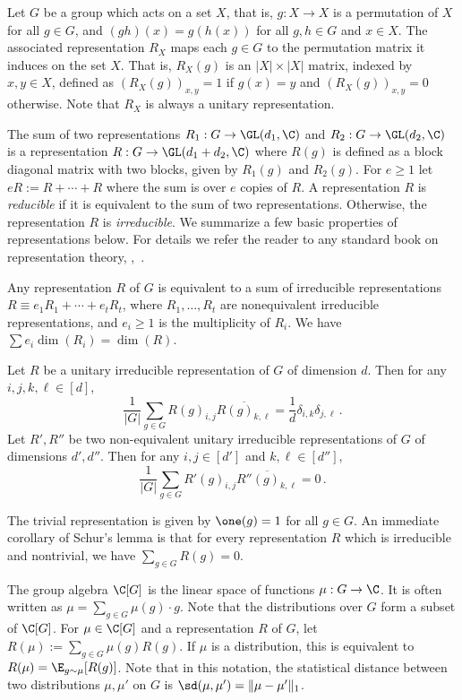 Let $G$ be a group which acts on a set $X$, that is, $g:X \to X$ is
a permutation of $X$ for all $g \in G$, and $(gh)(x)=g(h(x))$ for all
$g,h \in G$ and $x \in X$. The associated representation $R_X$ maps each
$g \in G$ to the permutation matrix it induces on the set $X$. That is,
$R_X(g)$ is an $|X| \times |X|$ matrix, indexed by $x,y \in X$, defined
as $(R_X(g))_{x,y}=1$ if $g(x)=y$ and $(R_X(g))_{x,y}=0$ otherwise. Note
that $R_X$ is always a unitary representation.

The sum of two representations $R_1:G \to \GL(d_1,\C)$ and $R_2:G \to
\GL(d_2,\C)$ is a representation $R:G \to \GL(d_1+d_2,\C)$ where $R(g)$ is
defined as a block diagonal matrix with two blocks, given by $R_1(g)$ and
$R_2(g)$. For $e \ge 1$ let $e R := R+\cdots+R$ where the sum is over $e$
copies of $R$. A representation $R$ is \emph{reducible} if it is equivalent
to the sum of two representations. Otherwise, the representation
$R$ is \emph{irreducible}. We summarize a few basic properties of
representations below. For details we refer the reader to any standard
book on representation theory, \eg,~\cite{RepresentationTheory}.

\begin{fact}\label{fact:maschke}
Any representation $R$ of $G$ is equivalent to a sum of irreducible
representations $R \equiv e_1 R_1+\cdots+e_ tR_t$, where $R_1,\ldots,R_t$
are nonequivalent irreducible representations, and $e_i \ge 1$ is the
multiplicity of $R_i$. We have $\sum e_i \dim(R_i) = \dim(R)$.
\end{fact}

\begin{fact}\label{fact:schur}
Let $R$ be a unitary irreducible representation
of $G$ of dimension $d$. Then for any $i,j,k,\ell \in [d]$,
$$
\frac{1}{|G|} \sum_{g \in G} R(g)_{i,j}
\overline{R(g)_{k,\ell}} = \frac{1}{d} \delta_{i,k} \delta_{j,\ell}\,.
$$
Let $R',R''$ be two non-equivalent unitary irreducible
representations of $G$ of dimensions $d',d''$.
Then for any $i,j \in [d']$ and $k,\ell \in [d'']$,
$$
\frac{1}{|G|} \sum_{g \in G} R'(g)_{i,j} \overline{R''(g)_{k,\ell}} = 0\,.
$$
\end{fact}

The trivial representation is given by $\one(g)=1$ for all $g \in G$. An
immediate corollary of Schur's lemma is that
for every representation $R$ which is irreducible
and nontrivial, we have $\sum_{g \in G} R(g)=0$.

The group algebra $\C[G]$ is the linear space of functions $\mu:G \to
\C$. It is often written as $\mu = \sum_{g \in G} \mu(g) \cdot g$. Note
that the distributions over $G$ form
a subset of $\C[G]$. For $\mu \in \C[G]$
and a representation $R$ of $G$, let
$R(\mu) := \sum_{g \in G} \mu(g) R(g)$. If $\mu$ is a distribution,
this is equivalent to $R(\mu) = \E_{g \sim \mu}[R(g)]$. Note that in this
notation, the statistical distance between two distributions $\mu,\mu'$ on
$G$ is $\sd(\mu,\mu')=\|\mu-\mu'\|_1$.



